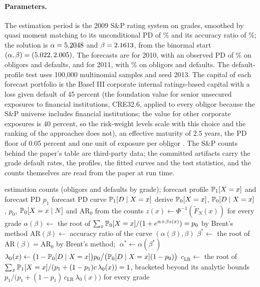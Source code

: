 \paragraph{Parameters.} The estimation period is the 2009 S\&P rating system on \rtgGradesTasche{} grades, smoothed by quasi moment matching to its unconditional PD of \rtgQmmPd{}\% and its accuracy ratio of \rtgQmmAr{}\%; the solution is $\alpha=5.2048{}$ and $\beta=2.1613{}$, from the binormal start $(\alpha,\beta)=(5.022{},2.005{})$. The forecasts are for 2010, with an observed PD of \rtgCalYaObs{}\% on \rtgCalYaN{} obligors and \rtgCalYaD{} defaults, and for 2011, with \rtgCalYbObs{}\% on \rtgCalYbN{} obligors and \rtgCalYbD{} defaults. The default-profile test uses 100,000 multinomial samples and seed 2013. The capital of each forecast portfolio is the Basel III corporate internal ratings-based capital with a loss given default of 45 percent (the foundation value for senior unsecured exposures to financial institutions, CRE32.6, applied to every obligor because the S\&P universe includes financial institutions; the value for other corporate exposures is 40 percent, so the risk-weight levels scale with this choice and the ranking of the approaches does not), an effective maturity of 2.5 years, the PD floor of 0.05 percent and one unit of exposure per obligor \citep{ratings:bcbs2005,ratings:cre32}. The S\&P counts behind the paper's table are third-party data; the committed artifacts carry the grade default rates, the profiles, the fitted curves and the test statistics, and the counts themselves are read from the paper at run time.

\begin{algorithm}[htbp]
\caption{Carrying a PD curve to a forecast period: quasi moment matching and the scaled likelihood ratio.}
\label{alg:ratings-calibration}
\begin{algorithmic}[1]
\Require estimation counts (obligors and defaults by grade); forecast profile $\mathbb{P}_1[X=x]$ and forecast PD $p_1$
\Ensure forecast PD curve $\mathbb{P}_1[D\mid X=x]$
\State derive $\mathbb{P}_0[X=x]$, $\mathbb{P}_0[D\mid X=x]$, $p_0$, $\mathbb{P}_0[X=x\mid N]$ and $\mathrm{AR}_0$ from the counts 
\State $z(x)\gets\Phi^{-1}(\tilde F_N(x))$ for every grade
  \State $\alpha(\beta)\gets$ the root of $\sum_x\mathbb{P}_0[X=x]/(1+e^{\alpha+\beta z(x)})=p_0$ by Brent's method
  \State $\mathrm{AR}(\beta)\gets$ accuracy ratio of the curve $(\alpha(\beta),\beta)$
\EndFor
\State $\beta^{*}\gets$ the root of $\mathrm{AR}(\beta)=\mathrm{AR}_0$ by Brent's method; $\;\alpha^{*}\gets\alpha(\beta^{*})$ 
\State $\lambda_0(x)\gets\bigl(1-\mathbb{P}_0[D\mid X=x]\bigr)p_0\big/\bigl(\mathbb{P}_0[D\mid X=x](1-p_0)\bigr)$
\State $c_{\mathrm{LR}}\gets$ the root of $\sum_x\mathbb{P}_1[X=x]/(p_1+(1-p_1)c\,\lambda_0(x))=1$, bracketed beyond its analytic bounds 
\State \Return $p_1/\bigl(p_1+(1-p_1)\,c_{\mathrm{LR}}\,\lambda_0(x)\bigr)$ for every grade
\end{algorithmic}
\end{algorithm}

